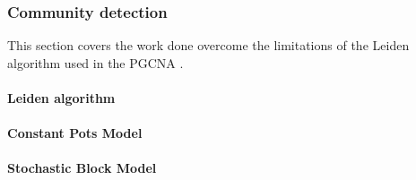 \subsubsection{Community detection}

This section covers the work done overcome the limitations of the Leiden algorithm used in the PGCNA \cite{Care2019-ij}.

\paragraph{Leiden algorithm}

\paragraph{Constant Pots Model}

\paragraph{Stochastic Block Model}
